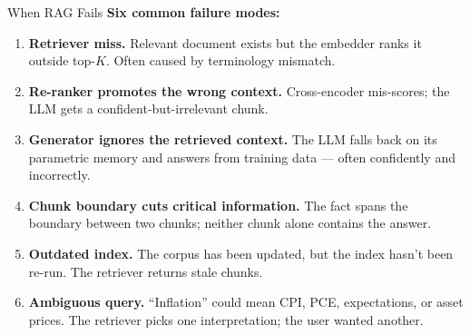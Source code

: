 \begin{frame}{When RAG Fails}
\textbf{Six common failure modes:}
\begin{enumerate}
\item \textbf{Retriever miss.} Relevant document exists but the embedder ranks it outside top-$K$. Often caused by terminology mismatch.

\medskip
\item \textbf{Re-ranker promotes the wrong context.} Cross-encoder mis-scores; the LLM gets a confident-but-irrelevant chunk.

\medskip
\item \textbf{Generator ignores the retrieved context.} The LLM falls back on its parametric memory and answers from training data --- often confidently and incorrectly.

\medskip
\item \textbf{Chunk boundary cuts critical information.} The fact spans the boundary between two chunks; neither chunk alone contains the answer.

\medskip
\item \textbf{Outdated index.} The corpus has been updated, but the index hasn't been re-run. The retriever returns stale chunks.

\medskip
\item \textbf{Ambiguous query.} ``Inflation'' could mean CPI, PCE, expectations, or asset prices. The retriever picks one interpretation; the user wanted another.
\end{enumerate}
\end{frame}

